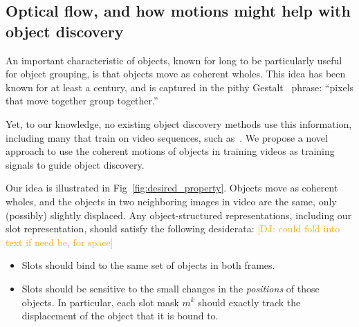 \documentclass{article}
\newcommand{\jd}[1]{\textcolor{orange}{[DJ: #1]}}
\begin{document}

\subsection{Optical flow, and how motions might help with object discovery} \label{sec:flow}

An important characteristic of objects, known for long to be particularly useful for object grouping, is that objects move as coherent wholes. This idea has been known for at least a century, and is captured in the pithy Gestalt~\cite{wertheimer1938laws} phrase: ``pixels that move together group together.'' 

Yet, to our knowledge, no existing object discovery methods use this information, including many that train on video sequences, such as~\cite{racah2020slot, jakab2018unsupervised, kipf2019contrastive}. %
We propose a novel approach to use the coherent motions of objects in training videos as training signals to guide %
object discovery. %

Our idea is illustrated in Fig~\ref{fig:desired_property}. Objects move as coherent wholes, and the objects in two neighboring images in video are the same, only (possibly) slightly displaced. Any object-structured representations, including our slot representation, should satisfy the following desiderata: \jd{could fold into text if need be, for space}
\begin{itemize}[leftmargin=*]
 \item Slots should bind to the same set of objects in both frames. 
 \item Slots should be sensitive to the small changes in the \emph{positions} of those objects. In particular, each slot mask $m^k$ should exactly track the displacement of the object that it is bound to.
\end{itemize}
\end{document}
